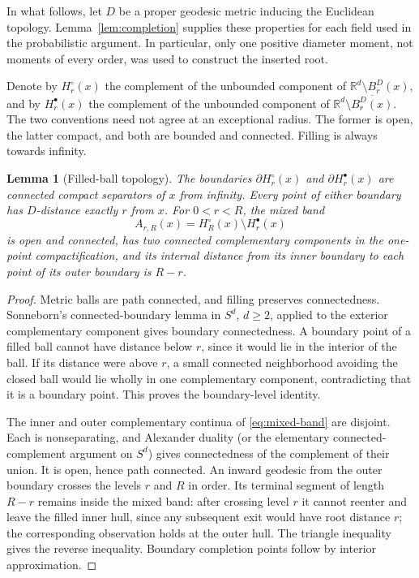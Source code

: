 \documentclass[11pt,reqno]{amsart}
\theoremstyle{plain}
\newtheorem{lemma}[theorem]{Lemma}
\theoremstyle{definition}
\theoremstyle{remark}
\newcommand{\R}{\mathbb R}
\newcommand{\1}{\mathbf{1}}
\newcommand{\bd}{B^{D}}
\begin{document}
In what follows, let $D$ be a proper geodesic metric inducing the Euclidean topology. Lemma~\ref{lem:completion} supplies these properties for each field used in the probabilistic argument. In particular, only one positive diameter moment, not moments of every order, was used to construct the inserted root.

Denote by $H_r^\circ(x)$ the complement of the unbounded component of $\R^d\setminus\bd_r(x)$, and by $H_r^\bullet(x)$ the complement of the unbounded component of $\R^d\setminus\overline{\bd_r(x)}$. The two conventions need not agree at an exceptional radius. The former is open, the latter compact, and both are bounded and connected. Filling is always towards infinity.

\begin{lemma}[Filled-ball topology]\label{lem:hulls}
The boundaries $\partial H_r^\circ(x)$ and $\partial H_r^\bullet(x)$ are connected compact separators of $x$ from infinity. Every point of either boundary has $D$-distance exactly $r$ from $x$. For $0<r<R$, the mixed band
\begin{equation}\label{eq:mixed-band}
A_{r,R}(x)=H_R^\circ(x)\setminus H_r^\bullet(x)
\end{equation}
is open and connected, has two connected complementary components in the one-point compactification, and its internal distance from its inner boundary to each point of its outer boundary is $R-r$.
\end{lemma}
\begin{proof}
Metric balls are path connected, and filling preserves connectedness. Sonneborn's connected-boundary lemma \cite[Lemma 1]{Sonneborn} in $S^d$, $d\ge2$, applied to the exterior complementary component gives boundary connectedness. A boundary point of a filled ball cannot have distance below $r$, since it would lie in the interior of the ball. If its distance were above $r$, a small connected neighborhood avoiding the closed ball would lie wholly in one complementary component, contradicting that it is a boundary point. This proves the boundary-level identity.

The inner and outer complementary continua of \eqref{eq:mixed-band} are disjoint. Each is nonseparating, and Alexander duality (or the elementary connected-complement argument on $S^d$) gives connectedness of the complement of their union. It is open, hence path connected. An inward geodesic from the outer boundary crosses the levels $r$ and $R$ in order. Its terminal segment of length $R-r$ remains inside the mixed band: after crossing level $r$ it cannot reenter and leave the filled inner hull, since any subsequent exit would have root distance $r$; the corresponding observation holds at the outer hull. The triangle inequality gives the reverse inequality. Boundary completion points follow by interior approximation.
\end{proof}
\end{document}
